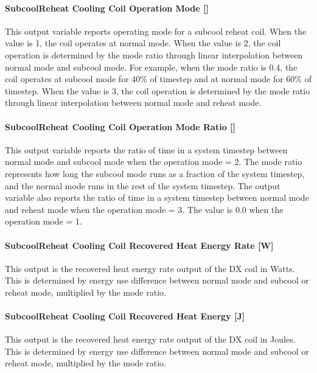 \paragraph{SubcoolReheat Cooling Coil Operation Mode {[]}}\label{subcoolreheat-cooling-coil-operation-mode}

This output variable reports operating mode for a subcool reheat coil. When the value is 1, the coil operates at normal mode. When the value is 2, the coil operation is determined by the mode ratio through linear interpolation between normal mode and subcool mode. For example, when the mode ratio is 0.4, the coil operates at subcool mode for 40\% of timestep and at normal mode for 60\% of timestep. When the value is 3, the coil operation is determined by the mode ratio through linear interpolation between normal mode and reheat mode.

\paragraph{SubcoolReheat Cooling Coil Operation Mode Ratio {[]}}\label{subcoolreheat-cooling-coil-operation-mode-ratio}

This output variable reports the ratio of time in a system timestep between normal mode and subcool mode when the operation mode = 2. The mode ratio represents how long the subcool mode runs as a fraction of the system timestep, and the normal mode runs in the rest of the system timestep. The output variable also reports the ratio of time in a system timestep between normal mode and reheat mode when the operation mode = 3. The value is 0.0 when the operation mode = 1.

\paragraph{SubcoolReheat Cooling Coil Recovered Heat Energy Rate {[}W{]}}\label{subcoolreheat-cooling-coil-recovered-heat-energy-rate-w}

This output is the recovered heat energy rate output of the DX coil in Watts. This is determined by energy use difference between normal mode and subcool or reheat mode, multiplied by the mode ratio.

\paragraph{SubcoolReheat Cooling Coil Recovered Heat Energy {[}J{]}}\label{subcoolreheat-cooling-coil-recovered-heat-energy-j}

This output is the recovered heat energy rate output of the DX coil in Joules. This is determined by energy use difference between normal mode and subcool or reheat mode, multiplied by the mode ratio.

